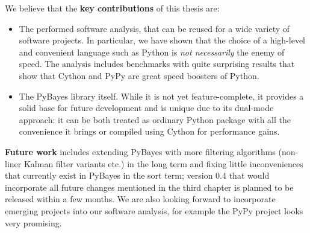 \noindent{}We believe that the \textbf{key contributions} of this thesis are:
\begin{itemize}
	\item The performed software analysis, that can be reused for a wide variety of software
		projects. In particular, we have shown that the choice of a high-level and convenient
		language such as Python is \emph{not necessarily} the enemy of speed. The analysis includes
		benchmarks with quite surprising results that show that Cython and PyPy are great speed
		boosters of Python.
	\item The PyBayes library itself. While it is not yet feature-complete, it provides a solid base
		for future development and is unique due to its dual-mode approach: it can be both treated
		as ordinary Python package with all the convenience it brings or compiled using Cython for
		performance gains.
\end{itemize}
\textbf{Future work} includes extending PyBayes with more filtering algorithms (non-liner Kalman
filter variants etc.) in the long term and fixing little inconveniences that currently exist in
PyBayes in the sort term; version 0.4 that would incorporate all future changes mentioned in the
third chapter is planned to be released within a few months. We are also looking forward to
incorporate emerging projects into our software analysis, for example the PyPy project looks very
promising.
